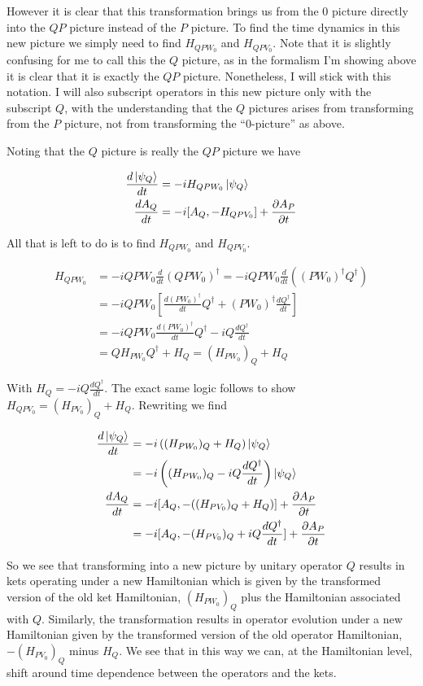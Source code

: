 \documentclass[12pt]{article}
\newcommand{\ddt}[1]{\frac{d #1}{dt}}
\newcommand{\ppt}[1]{\frac{\partial #1}{\partial t}}
\begin{document}
However it is clear that this transformation brings us from the $0$ picture directly into the $QP$ picture instead of the $P$ picture. To find the time dynamics in this new picture we simply need to find $H_{QPW_0}$ and $H_{QPV_0}$. Note that it is slightly confusing for me to call this the $Q$ picture, as in the formalism I'm showing above it is clear that it is exactly the $QP$ picture. Nonetheless, I will stick with this notation. I will also subscript operators in this new picture only with the subscript $Q$, with the understanding that the $Q$ pictures arises from transforming from the $P$ picture, not from transforming the ``0-picture'' as above.

Noting that the $Q$ picture is really the $QP$ picture we have

\begin{align}
\ddt{\ket{\psi_Q}} &= -iH_{QPW_0}\ket{\psi_Q}\\
\ddt{A_Q} &= -i[A_Q,-H_{QPV_0}] + \ppt{A_P}
\end{align}

All that is left to do is to find $H_{QPW_0}$ and $H_{QPV_0}$.

\begin{align}
H_{QPW_0} &= -i QPW_0 \ddt{}\left(QPW_0\right)^{\dag} = -i QPW_0 \ddt{}\left(\left(PW_0\right)^{\dag}Q^{\dag} \right)\\
&= -i QPW_0 \left[\ddt{(PW_0)^{\dag}}Q^{\dag} + (PW_0)^{\dag} \ddt{Q^{\dag}} \right]\\
&= -i Q PW_0 \ddt{(PW_0)^{\dag}}Q^{\dag} -i Q \ddt{Q^{\dag}}\\
&= QH_{PW_0}Q^{\dag} + H_Q = \left(H_{PW_0} \right)_Q + H_Q
\end{align}

With $H_Q = -i Q \ddt{Q^{\dag}}$.
The exact same logic follows to show $H_{QPV_0} = (H_{PV_0})_Q + H_Q$. Rewriting we find

\begin{align}
\ddt{\ket{\psi_Q}} &= -i\left((H_{PW_0})_Q + H_Q \right)\ket{\psi_Q}\\
&= -i\left((H_{PW_0})_Q -i Q\ddt{Q^{\dag}} \right)\ket{\psi_Q}\\
\ddt{A_Q} &= -i[A_Q,-((H_{PV_0})_Q+H_Q)] + \ppt{A_P}\\
&= -i[A_Q,-(H_{PV_0})_Q + i Q\ddt{Q^{\dag}}] + \ppt{A_P}
\end{align}

So we see that transforming into a new picture by unitary operator $Q$ results in kets operating under a new Hamiltonian which is given by the transformed version of the old ket Hamiltonian, $(H_{PW_0})_Q$ plus the Hamiltonian associated with $Q$. Similarly, the transformation results in operator evolution under a new Hamiltonian given by the transformed version of the old operator Hamiltonian, $-(H_{PV_0})_Q$ minus $H_Q$. We see that in this way we can, at the Hamiltonian level, shift around time dependence between the operators and the kets.
 
\end{document}
